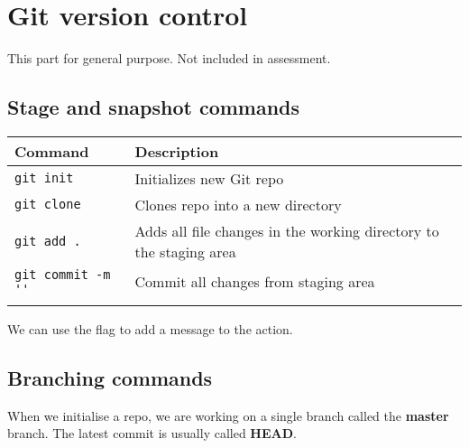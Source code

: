 \documentclass{article}
\begin{document}
\section{Git version control}
This part for general purpose. Not included in assessment. 
\subsection{Stage and snapshot commands}
\begin{table}[H]
    \begin{tabular}{ll}
        \textbf{Command}             & \textbf{Description}                                               \\ \hline
        \lstinline|git init|         & Initializes new Git repo                                           \\ \arrayrulecolor{lightgray}\hline
        \lstinline|git clone|        & Clones repo into a new directory                                   \\ \arrayrulecolor{lightgray}\hline
        \lstinline|git add . |       & Adds all file changes in the working directory to the staging area \\ \arrayrulecolor{lightgray}\hline
        \lstinline|git commit -m ''| & Commit all changes from staging area                               \\ \arrayrulecolor{lightgray}\hline
    \end{tabular}
\end{table}
We can use the  flag to add a message to the action.
\subsection{Branching commands}
When we initialise a repo, we are working on a single branch called the \textbf{master} branch. The latest commit is usually called \textbf{HEAD}.
\end{document}
